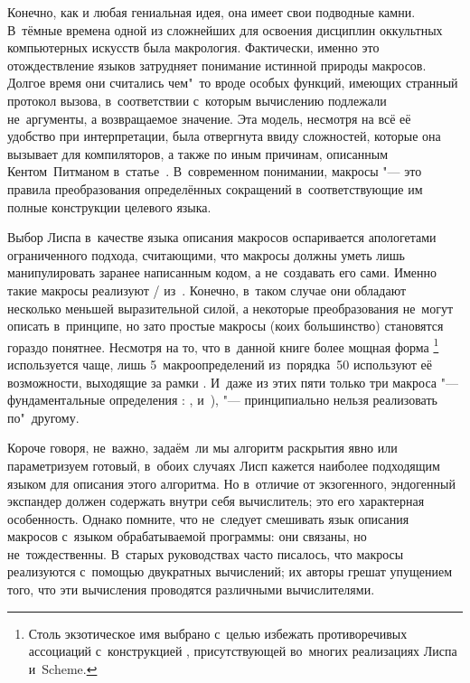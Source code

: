 Конечно, как и любая гениальная идея, она имеет свои подводные камни. В~тёмные
времена одной из сложнейших для освоения дисциплин оккультных компьютерных
искусств была макрология.
Фактически, именно это отождествление языков затрудняет понимание истинной
природы макросов. Долгое время они считались чем"~то вроде особых функций,
имеющих странный протокол вызова, в~соответствии с~которым вычислению подлежали
не~аргументы, а возвращаемое значение. Эта модель, несмотря на всё её удобство
при интерпретации, была отвергнута ввиду сложностей, которые она вызывает для
компиляторов, а также по иным причинам, описанным Кентом~Питманом
в~статье~\cite{pit80}. В~современном понимании, макросы "--- это правила
преобразования определённых сокращений в~соответствующие им полные конструкции
целевого языка.

Выбор Лиспа в~качестве языка описания макросов оспаривается апологетами
ограниченного подхода, считающими, что макросы должны уметь лишь манипулировать
заранее написанным кодом, а не~создавать его сами. Именно такие макросы
реализуют \slash{} из~\RnRS. Конечно, в~таком
случае они обладают несколько меньшей выразительной силой, а некоторые
преобразования не~могут описать в~принципе, но зато простые макросы (коих
большинство) становятся гораздо понятнее. Несмотря на то, что в~данной книге
более мощная форма \footnote{Столь экзотическое имя
выбрано с~целью избежать противоречивых ассоциаций с~конструкцией
, присутствующей во~многих реализациях Лиспа и~Scheme.}
используется чаще, лишь 5~макроопределений из~порядка~50 используют её
возможности, выходящие за рамки . И~даже из этих пяти только
три макроса "--- фундаментальные определения {\Meroonet}: ,
 и~), "--- принципиально нельзя реализовать
по"~другому.

Короче говоря, не~важно, задаём~ли мы алгоритм раскрытия явно или параметризуем
готовый, в~обоих случаях Лисп кажется наиболее подходящим языком для описания
этого алгоритма. Но в~отличие от экзогенного, эндогенный экспандер должен
содержать внутри себя вычислитель; это его характерная особенность. Однако
помните, что не~следует смешивать язык описания макросов с~языком обрабатываемой
программы: они связаны, но не~тождественны. В~старых руководствах часто
писалось, что макросы реализуются с~помощью двукратных вычислений; их авторы
грешат упущением того, что эти вычисления проводятся различными вычислителями.

